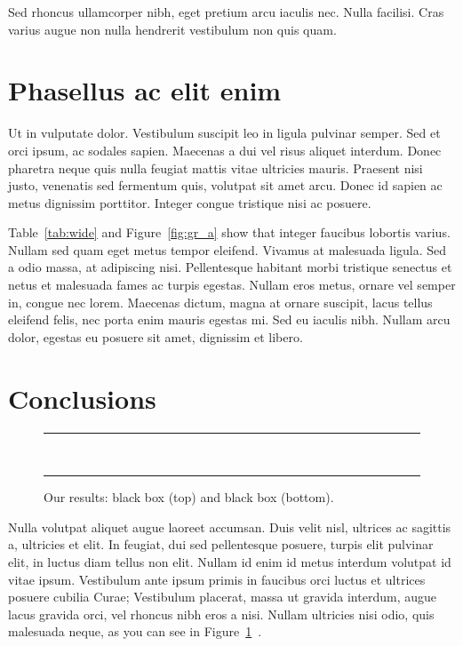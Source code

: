 \documentclass[eprint]{actapoly}
\begin{document}
Sed rhoncus ullamcorper nibh, eget pretium arcu iaculis nec.
Nulla facilisi.
Cras varius augue non nulla hendrerit vestibulum non quis quam.





\section{Phasellus ac elit enim}
\label{sect:Pha}




Ut in vulputate dolor.
Vestibulum suscipit leo in ligula pulvinar semper.
Sed et orci ipsum, ac sodales sapien.
Maecenas a dui vel risus aliquet interdum.
Donec pharetra neque quis nulla feugiat mattis vitae ultricies mauris.
Praesent nisi justo, venenatis sed fermentum quis, volutpat sit amet arcu.
Donec id sapien ac metus dignissim porttitor.
Integer congue tristique nisi ac posuere.

Table~\ref{tab:wide} and Figure~\ref{fig:gr_a} show that integer faucibus lobortis varius.
Nullam sed quam eget metus tempor eleifend.
Vivamus at malesuada ligula.
Sed a odio massa, at adipiscing nisi.
Pellentesque habitant morbi tristique senectus et netus et malesuada fames ac turpis egestas.
Nullam eros metus, ornare vel semper in, congue nec lorem.
Maecenas dictum, magna at ornare suscipit, lacus tellus eleifend felis, nec porta enim mauris egestas mi.
Sed eu iaculis nibh.
Nullam arcu dolor, egestas eu posuere sit amet, dignissim et libero.




\section{Conclusions}




\begin{figure}
\centering
\rule{5cm}{5cm} %
\\[3mm]
\rule{5cm}{5cm} %
\caption{Our results: black box (top) and black box (bottom).}
\label{fig:res}
\end{figure}



Nulla volutpat aliquet augue laoreet accumsan.
Duis velit nisl, ultrices ac sagittis a, ultricies et elit.
In feugiat, dui sed pellentesque posuere, turpis elit pulvinar elit, in luctus diam tellus non elit.
Nullam id enim id metus interdum volutpat id vitae ipsum.
Vestibulum ante ipsum primis in faucibus orci luctus et ultrices posuere cubilia Curae;
 Vestibulum placerat, massa ut gravida interdum, augue lacus gravida orci, vel rhoncus nibh eros a nisi.
Nullam ultricies nisi odio, quis malesuada neque, as you can see in Figure~\ref{fig:res}~\cite{doi}.
\end{document}
